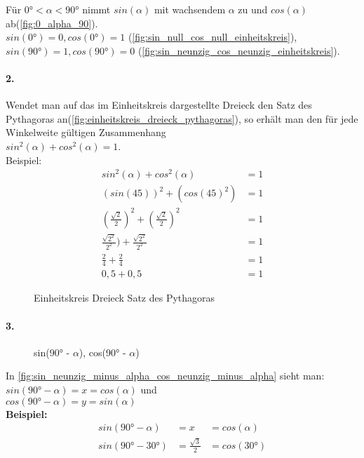 \documentclass[12pt,a4paper]{article}
\begin{document}
\noindent Für $0° < \alpha < 90°$ nimmt $sin(\alpha)$ mit wachsendem $\alpha$ zu und $cos(\alpha)$ ab(\autoref{fig:0_alpha_90}). \\
$sin(0°) = 0, cos(0°) = 1$ (\autoref{fig:sin_null_cos_null_einheitskreis}), $sin(90°) = 1, cos(90°) = 0$ (\autoref{fig:sin_neunzig_cos_neunzig_einheitskreis}).
\newpage
\paragraph{2.}
Wendet man auf das im Einheitskreis dargestellte Dreieck den Satz des Pythagoras an(\autoref{fig:einheitskreis_dreieck_pythagoras}), so erhält man den für jede Winkelweite gültigen Zusammenhang \\
$sin^2(\alpha) + cos^2(\alpha) = 1$. \\
Beispiel:
\begin{align}
	sin^2(\alpha) + cos^2(\alpha)                    & = 1 \tag{1}  \\
	(sin(45))^2 + (cos(45)^2)                        & = 1  \tag{2} \\
	(\frac{\sqrt{2}}{2})^2 + (\frac{\sqrt{2}}{2})^2  & = 1 \tag{3}  \\
	\frac{\sqrt{2^2}}{2^2}) + \frac{\sqrt{2^2}}{2^2} & = 1 \tag{4}  \\
	\frac{2}{4} + \frac{2}{4}                        & = 1 \tag{5}  \\
	0,5 + 0,5                                        & = 1 \tag{6}
\end{align}

\begin{figure}[hb!]
	\center
	\def\svgwidth{200px}
	
	\caption{Einheitskreis Dreieck Satz des Pythagoras}
	\label{fig:einheitskreis_dreieck_pythagoras}
\end{figure}
\paragraph{3.}
\begin{wrapfigure}[6]{r}{0.45\textwidth}
	\def\svgwidth{200px}
	
	\caption{sin(90° - $\alpha$), cos(90° - $\alpha$)}
	\label{fig:sin_neunzig_minus_alpha_cos_neunzig_minus_alpha}
\end{wrapfigure}
In \autoref{fig:sin_neunzig_minus_alpha_cos_neunzig_minus_alpha} sieht man: \\
$sin(90° - \alpha) = x = cos(\alpha)$ und \\
$cos(90° - \alpha) = y = sin(\alpha)$ \\
\textbf{Beispiel:}
\begin{align}
	sin(90° - \alpha) & = x                   & = cos(\alpha) \tag{1} \\
	sin(90° - 30°)    & =  \frac{\sqrt{3}}{2} & = cos(30°) \tag{2}
\end{align}
\end{document}
